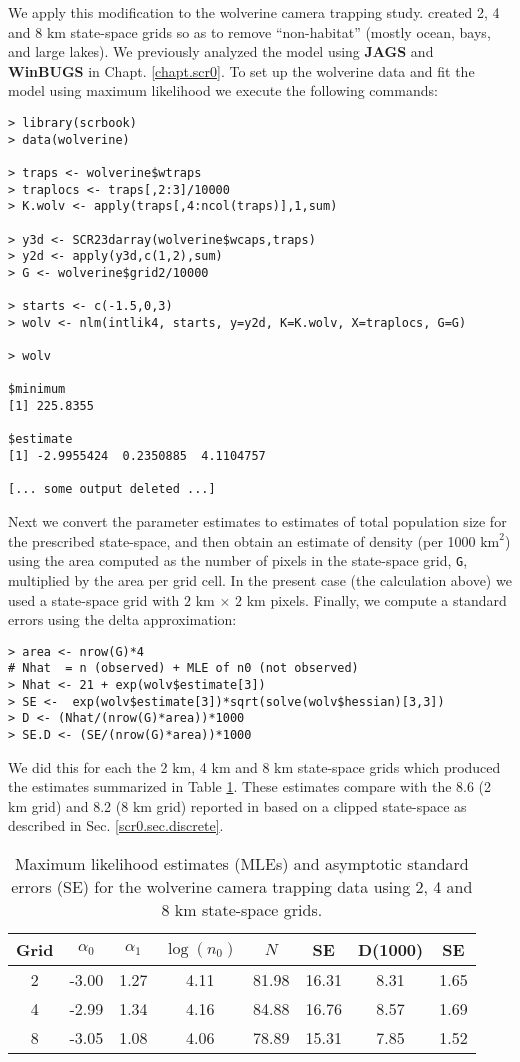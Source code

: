 We apply this modification to the wolverine camera trapping
study. \citet{royle_etal:2011jwm} created 2, 4 and 8 km state-space
grids so as to remove ``non-habitat'' (mostly ocean, bays, and large
lakes). We previously analyzed the model using {\bf JAGS} and {\bf WinBUGS} in
Chapt. \ref{chapt.scr0}.  To set up the wolverine data and fit the
model using maximum likelihood 
we execute the following commands:
{\small 
\begin{verbatim}
> library(scrbook)
> data(wolverine)

> traps <- wolverine$wtraps
> traplocs <- traps[,2:3]/10000
> K.wolv <- apply(traps[,4:ncol(traps)],1,sum)

> y3d <- SCR23darray(wolverine$wcaps,traps)
> y2d <- apply(y3d,c(1,2),sum)
> G <- wolverine$grid2/10000

> starts <- c(-1.5,0,3)
> wolv <- nlm(intlik4, starts, y=y2d, K=K.wolv, X=traplocs, G=G)

> wolv

$minimum
[1] 225.8355

$estimate
[1] -2.9955424  0.2350885  4.1104757

[... some output deleted ...]
\end{verbatim}
}

Next we convert the parameter estimates to estimates of total
population size for the prescribed state-space, and then obtain an
estimate of density (per 1000
$\text{km}^2$) using the area computed as the number of pixels in the
state-space grid, \mbox{\tt G}, multiplied by the area per grid cell. In
the present case (the calculation above) we used a state-space grid
with $2$ km $\times$ $2$ km pixels.  Finally, we compute
a standard errors using the delta approximation: 
\begin{verbatim}
> area <- nrow(G)*4
# Nhat  = n (observed) + MLE of n0 (not observed)
> Nhat <- 21 + exp(wolv$estimate[3])
> SE <-  exp(wolv$estimate[3])*sqrt(solve(wolv$hessian)[3,3])
> D <- (Nhat/(nrow(G)*area))*1000
> SE.D <- (SE/(nrow(G)*area))*1000
\end{verbatim}
We did this for each the 2 km, 4 km and 8 km state-space grids
which produced the estimates summarized in Table \ref{mle.tab.wolv}.
These estimates compare with the 8.6 (2 km grid) and 8.2 (8 km grid)
reported in 
\citet{royle_etal:2011jwm} based on a clipped state-space as described
in Sec. \ref{scr0.sec.discrete}.

\begin{table}
\centering
\caption{Maximum likelihood estimates (MLEs) and asymptotic standard
  errors (SE)  for the wolverine camera trapping data using 2, 4 and 8 km state-space grids.}
\begin{tabular}{cccccccc}
\hline \hline
Grid &  $\alpha_0$  &  $\alpha_1$ &   $\log(n_0)$  & $N$   &  SE & D(1000) &  SE \\ \hline
2  &  -3.00 & 1.27 &4.11  &81.98& 16.31 &8.31 &1.65\\
4  &  -2.99 & 1.34  &4.16 &84.88& 16.76 &8.57& 1.69\\
8   & -3.05 & 1.08 &4.06  &78.89& 15.31 &7.85& 1.52\\   \hline
\end{tabular}
\label{mle.tab.wolv}
\end{table}


